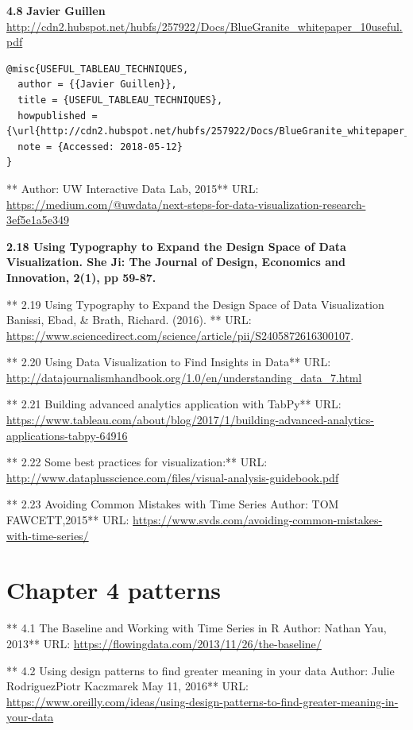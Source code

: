 \documentclass[]{book}
\theoremstyle{definition}
\theoremstyle{definition}
\theoremstyle{definition}
\theoremstyle{remark}
\begin{document}
\textbf{4.8} \textbf{Javier Guillen}\\
\url{http://cdn2.hubspot.net/hubfs/257922/Docs/BlueGranite_whitepaper_10useful.pdf}
\citep{USEFUL_TABLEAU_TECHNIQUES}

\begin{verbatim}
@misc{USEFUL_TABLEAU_TECHNIQUES,
  author = {{Javier Guillen}},
  title = {USEFUL_TABLEAU_TECHNIQUES},
  howpublished = {\url{http://cdn2.hubspot.net/hubfs/257922/Docs/BlueGranite_whitepaper_10useful.pdf}},
  note = {Accessed: 2018-05-12}
}
\end{verbatim}

** Author: UW Interactive Data Lab, 2015** URL:
\url{https://medium.com/@uwdata/next-steps-for-data-visualization-research-3ef5e1a5e349}

\textbf{2.18 Using Typography to Expand the Design Space of Data
Visualization. She Ji: The Journal of Design, Economics and Innovation,
2(1), pp 59-87.}

** 2.19 Using Typography to Expand the Design Space of Data
Visualization\textbf{ }Banissi, Ebad, \& Brath, Richard. (2016). ** URL:
\url{https://www.sciencedirect.com/science/article/pii/S2405872616300107}.

** 2.20 Using Data Visualization to Find Insights in Data** URL:
\url{http://datajournalismhandbook.org/1.0/en/understanding_data_7.html}

** 2.21 Building advanced analytics application with TabPy** URL:
\url{https://www.tableau.com/about/blog/2017/1/building-advanced-analytics-applications-tabpy-64916}

** 2.22 Some best practices for visualization:** URL:
\url{http://www.dataplusscience.com/files/visual-analysis-guidebook.pdf}

** 2.23 Avoiding Common Mistakes with Time Series\textbf{ }Author: TOM
FAWCETT,2015** URL:
\url{https://www.svds.com/avoiding-common-mistakes-with-time-series/}

\section{Chapter 4 patterns}\label{chapter-4-patterns-1}

** 4.1 The Baseline and Working with Time Series in R\textbf{ }Author:
Nathan Yau, 2013** URL:
\url{https://flowingdata.com/2013/11/26/the-baseline/}

** 4.2 Using design patterns to find greater meaning in your
data\textbf{ }Author: Julie RodriguezPiotr Kaczmarek May 11, 2016** URL:
\url{https://www.oreilly.com/ideas/using-design-patterns-to-find-greater-meaning-in-your-data}
\end{document}
